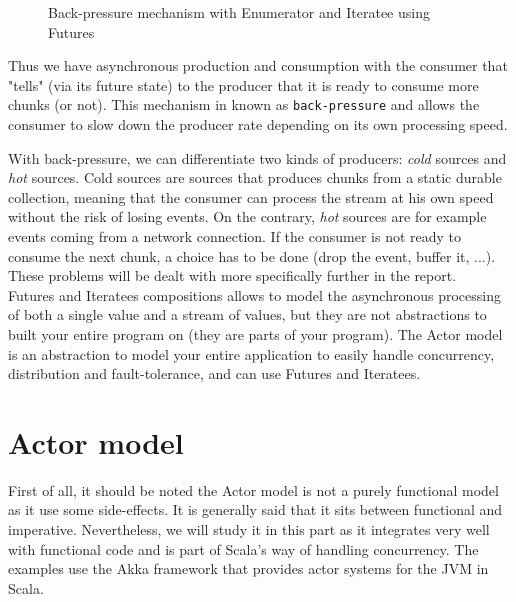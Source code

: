 \begin{figure}[h]
  \begin{center} 
    \caption{Back-pressure mechanism with Enumerator and Iteratee using Futures}
    \label{fig:itenum}
  \end{center}
\end{figure}

Thus we have asynchronous production and consumption with the consumer that "tells" (via its future state) to the producer that it is ready to 
consume more chunks (or not). This mechanism in known as \verb|back-pressure| and allows the consumer to slow down the producer rate depending on its 
own processing speed. 

With back-pressure, we can differentiate two kinds of producers: \textit{cold} sources and \textit{hot} sources. Cold sources are sources that
produces chunks from a static durable collection, meaning that the consumer can process the stream at his own speed without the risk of losing events.
On the contrary, \textit{hot} sources are for example events coming from a network connection. If the consumer is not ready to consume the next chunk,
a choice has to be done (drop the event, buffer it, ...). These problems will be dealt with more specifically further in the report.
\\

Futures and Iteratees compositions allows to model the asynchronous processing of both a single value and a stream of values, but 
they are not abstractions to built your entire program on (they are parts of your program).
The Actor model is an abstraction to model your entire application to easily handle concurrency, distribution and fault-tolerance, and can use Futures and Iteratees.

\section{Actor model}

First of all, it should be noted the Actor model is not a purely functional model as it use some side-effects. It is generally said that it sits between functional and
imperative. Nevertheless, we will study it in this part as it integrates very well with functional code and is part of Scala's way of handling concurrency.
The examples use the Akka framework  that provides actor systems for the JVM in Scala.
\\

